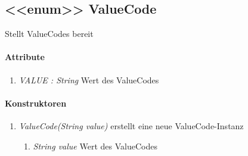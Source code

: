 \subsection{<{<{enum}>}> ValueCode}
Stellt ValueCodes bereit

\paragraph{Attribute}
\begin{enumerate}[$\bullet$]
	\item \textit{VALUE : String} Wert des ValueCodes
\end{enumerate}

\paragraph{Konstruktoren}
\begin{enumerate}[+]
	\item \textit{ ValueCode(String value)}
	erstellt eine neue ValueCode-Instanz
	\begin{enumerate}[$\bullet$]
		\item \textit{String value} Wert des ValueCodes

	\end{enumerate}
	
\end{enumerate}
